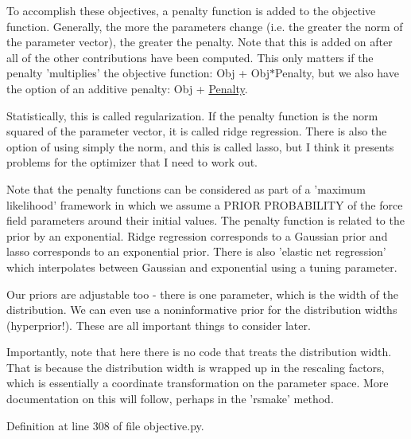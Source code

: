To accomplish these objectives, a penalty function is added to the objective function. Generally, the more the parameters change (i.\-e. the greater the norm of the parameter vector), the greater the penalty. Note that this is added on after all of the other contributions have been computed. This only matters if the penalty 'multiplies' the objective function\-: Obj + Obj$\ast$\-Penalty, but we also have the option of an additive penalty\-: Obj + \hyperlink{classforcebalance_1_1objective_1_1Penalty}{Penalty}.

Statistically, this is called regularization. If the penalty function is the norm squared of the parameter vector, it is called ridge regression. There is also the option of using simply the norm, and this is called lasso, but I think it presents problems for the optimizer that I need to work out.

Note that the penalty functions can be considered as part of a 'maximum likelihood' framework in which we assume a P\-R\-I\-O\-R P\-R\-O\-B\-A\-B\-I\-L\-I\-T\-Y of the force field parameters around their initial values. The penalty function is related to the prior by an exponential. Ridge regression corresponds to a Gaussian prior and lasso corresponds to an exponential prior. There is also 'elastic net regression' which interpolates between Gaussian and exponential using a tuning parameter.

Our priors are adjustable too -\/ there is one parameter, which is the width of the distribution. We can even use a noninformative prior for the distribution widths (hyperprior!). These are all important things to consider later.

Importantly, note that here there is no code that treats the distribution width. That is because the distribution width is wrapped up in the rescaling factors, which is essentially a coordinate transformation on the parameter space. More documentation on this will follow, perhaps in the 'rsmake' method. 

Definition at line 308 of file objective.\-py.



